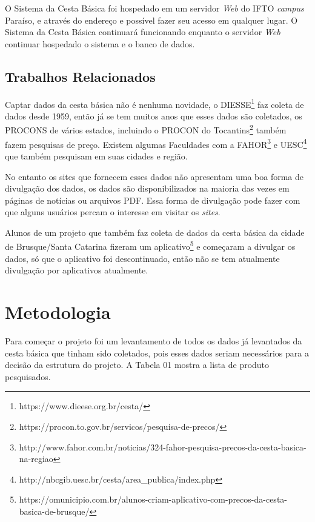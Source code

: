 \documentclass{ifto-tex}
\begin{document}
O Sistema da Cesta Básica foi hospedado em um servidor \textit{Web} do IFTO \textit{campus} Paraíso, e através do endereço e possível fazer seu acesso em qualquer lugar. O Sistema da Cesta Básica continuará funcionando enquanto o servidor \textit{Web} continuar hospedado o sistema e o banco de dados.


\section{Trabalhos Relacionados}
Captar dados da cesta básica não é nenhuma novidade, o DIESSE\footnote{https://www.dieese.org.br/cesta/} faz coleta de dados desde 1959, então já se tem muitos anos que esses dados são coletados, os PROCONS de vários estados, incluindo o PROCON do Tocantins\footnote{https://procon.to.gov.br/servicos/pesquisa-de-precos/} também fazem pesquisas de preço. Existem algumas Faculdades com a FAHOR\footnote{http://www.fahor.com.br/noticias/324-fahor-pesquisa-precos-da-cesta-basica-na-regiao} e UESC\footnote{http://nbcgib.uesc.br/cesta/area\_publica/index.php} que também pesquisam em suas cidades e região.

No entanto os sites que fornecem esses dados não apresentam uma boa forma de divulgação dos dados, os dados são disponibilizados na maioria das vezes em páginas de notícias  ou arquivos PDF. Essa forma de divulgação pode fazer com que alguns usuários percam o interesse em visitar os \textit{sites}.

Alunos de um projeto que também faz coleta de dados da cesta básica da cidade de Brusque/Santa Catarina fizeram um aplicativo\footnote{https://omunicipio.com.br/alunos-criam-aplicativo-com-precos-da-cesta-basica-de-brusque/} e começaram a divulgar os dados, só que o aplicativo foi descontinuado, então não se tem atualmente divulgação por aplicativos atualmente.	
\chapter{Metodologia}
	
	
Para começar o projeto foi um levantamento de todos os dados já levantados da cesta básica que tinham sido coletados, pois esses dados seriam necessários para a decisão da estrutura do projeto. A Tabela 01 mostra a lista de produto pesquisados.
\end{document}
